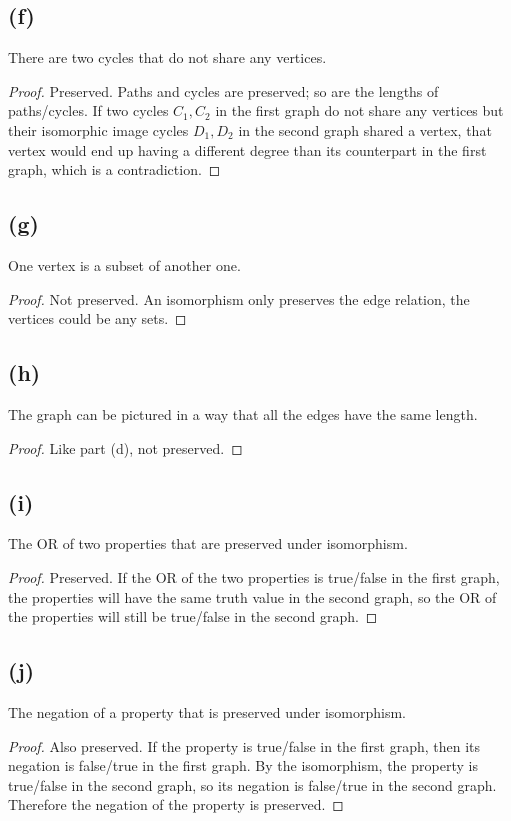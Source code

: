 \documentclass[14pt]{extarticle}
\begin{document}
\subsection{(f)}
There are two cycles that do not share any vertices.
\begin{proof}
Preserved. Paths and cycles are preserved; so are the lengths of paths/cycles. If two cycles $C_1, C_2$ in the first graph do not share any vertices but their isomorphic image cycles $D_1, D_2$ in the second graph shared a vertex, that vertex would end up having a different degree than its counterpart in the first graph, which is a contradiction.
\end{proof}

\subsection{(g)}
One vertex is a subset of another one.
\begin{proof}
Not preserved. An isomorphism only preserves the edge relation, the vertices could be any sets.
\end{proof}

\subsection{(h)}
The graph can be pictured in a way that all the edges have the same length.
\begin{proof}
Like part (d), not preserved.
\end{proof}

\subsection{(i)}
The OR of two properties that are preserved under isomorphism.
\begin{proof}
Preserved. If the OR of the two properties is true/false in the first graph, the properties will have the same truth value in the second graph, so the OR of the properties will still be true/false in the second graph.
\end{proof}

\subsection{(j)}
The negation of a property that is preserved under isomorphism.
\begin{proof}
Also preserved. If the property is true/false in the first graph, then its negation is false/true in the first graph. By the isomorphism, the property is true/false in the second graph, so its negation is false/true in the second graph. Therefore the negation of the property is preserved.
\end{proof}
\end{document}
